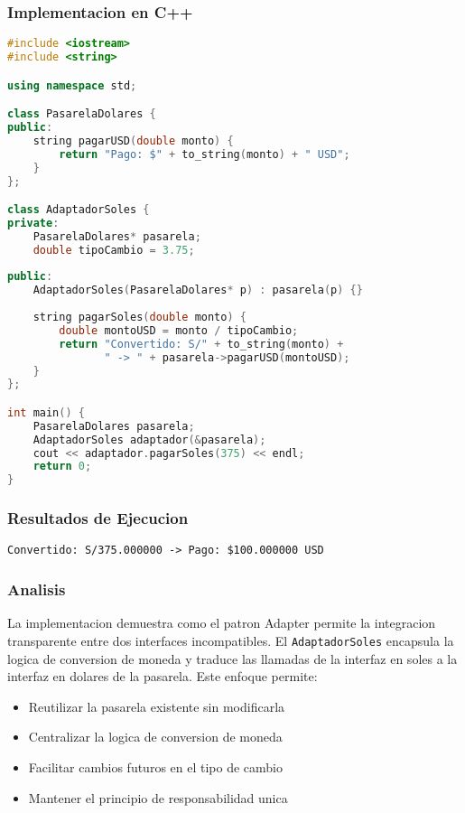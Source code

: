 \documentclass[11pt,a4paper]{article}
\begin{document}
\subsubsection{Implementacion en C++}

\begin{lstlisting}[language=C++, caption=Sistema de Adaptador de Pagos]
#include <iostream>
#include <string>

using namespace std;

class PasarelaDolares {
public:
    string pagarUSD(double monto) {
        return "Pago: $" + to_string(monto) + " USD";
    }
};

class AdaptadorSoles {
private:
    PasarelaDolares* pasarela;
    double tipoCambio = 3.75;
    
public:
    AdaptadorSoles(PasarelaDolares* p) : pasarela(p) {}
    
    string pagarSoles(double monto) {
        double montoUSD = monto / tipoCambio;
        return "Convertido: S/" + to_string(monto) + 
               " -> " + pasarela->pagarUSD(montoUSD);
    }
};

int main() {
    PasarelaDolares pasarela;
    AdaptadorSoles adaptador(&pasarela);
    cout << adaptador.pagarSoles(375) << endl;
    return 0;
}
\end{lstlisting}

\subsubsection{Resultados de Ejecucion}

\begin{verbatim}
Convertido: S/375.000000 -> Pago: $100.000000 USD
\end{verbatim}

\subsubsection{Analisis}

La implementacion demuestra como el patron Adapter permite la integracion transparente entre dos interfaces incompatibles. El \texttt{AdaptadorSoles} encapsula la logica de conversion de moneda y traduce las llamadas de la interfaz en soles a la interfaz en dolares de la pasarela. Este enfoque permite:

\begin{itemize}
    \item Reutilizar la pasarela existente sin modificarla
    \item Centralizar la logica de conversion de moneda
    \item Facilitar cambios futuros en el tipo de cambio
    \item Mantener el principio de responsabilidad unica
\end{itemize}
\end{document}
